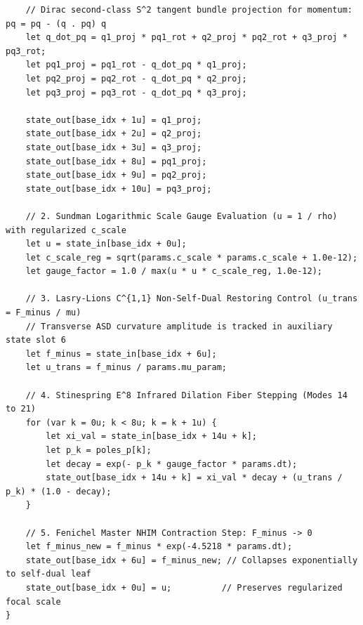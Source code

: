 \documentclass[11pt,a4paper,reqno]{article}
\theoremstyle{plain}
\theoremstyle{definition}
\theoremstyle{remark}
\numberwithin{equation}{section}
\begin{document}
\begin{lstlisting}
    // Dirac second-class S^2 tangent bundle projection for momentum: pq = pq - (q . pq) q
    let q_dot_pq = q1_proj * pq1_rot + q2_proj * pq2_rot + q3_proj * pq3_rot;
    let pq1_proj = pq1_rot - q_dot_pq * q1_proj;
    let pq2_proj = pq2_rot - q_dot_pq * q2_proj;
    let pq3_proj = pq3_rot - q_dot_pq * q3_proj;

    state_out[base_idx + 1u] = q1_proj;
    state_out[base_idx + 2u] = q2_proj;
    state_out[base_idx + 3u] = q3_proj;
    state_out[base_idx + 8u] = pq1_proj;
    state_out[base_idx + 9u] = pq2_proj;
    state_out[base_idx + 10u] = pq3_proj;

    // 2. Sundman Logarithmic Scale Gauge Evaluation (u = 1 / rho) with regularized c_scale
    let u = state_in[base_idx + 0u];
    let c_scale_reg = sqrt(params.c_scale * params.c_scale + 1.0e-12);
    let gauge_factor = 1.0 / max(u * u * c_scale_reg, 1.0e-12);

    // 3. Lasry-Lions C^{1,1} Non-Self-Dual Restoring Control (u_trans = F_minus / mu)
    // Transverse ASD curvature amplitude is tracked in auxiliary state slot 6
    let f_minus = state_in[base_idx + 6u];
    let u_trans = f_minus / params.mu_param;

    // 4. Stinespring E^8 Infrared Dilation Fiber Stepping (Modes 14 to 21)
    for (var k = 0u; k < 8u; k = k + 1u) {
        let xi_val = state_in[base_idx + 14u + k];
        let p_k = poles_p[k];
        let decay = exp(- p_k * gauge_factor * params.dt);
        state_out[base_idx + 14u + k] = xi_val * decay + (u_trans / p_k) * (1.0 - decay);
    }

    // 5. Fenichel Master NHIM Contraction Step: F_minus -> 0
    let f_minus_new = f_minus * exp(-4.5218 * params.dt);
    state_out[base_idx + 6u] = f_minus_new; // Collapses exponentially to self-dual leaf
    state_out[base_idx + 0u] = u;          // Preserves regularized focal scale
}
\end{lstlisting}

\FloatBarrier
\clearpage
\end{document}

